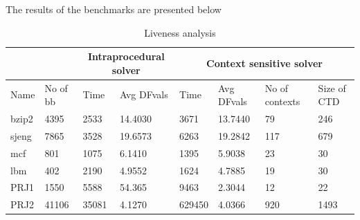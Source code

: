 \documentclass[12pt]{report}
\begin{document}
The results of the benchmarks are presented below

\begin {table}[H]
\label{tab:specliveness} 
\begin{flushleft}
\begin{tabular}{|l | l | l | p{2.3cm} | l | p{2.3cm} | p{1.4cm} | p{1.2cm} | }
  \hline                        
  \multicolumn{2}{|c|}{} &
  \multicolumn{2}{|c|}{Intraprocedural solver} &
  \multicolumn{4}{|c|}{Context sensitive solver} \\
  \hline
  Name & No of bb & Time & Avg DFvals &  Time  & Avg DFvals    & No of \newline contexts  & Size of \newline CTD \\  \hline  
  bzip2& 4395     & 2533 &  14.4030   & 3671   & 13.7440       & 79                       & 246                  \\ \hline  
  sjeng& 7865     & 3528 &  19.6573   & 6263   & 19.2842       & 117                      & 679                  \\  \hline  
  mcf  & 801      & 1075 &  6.1410    & 1395   & 5.9038        & 23                       & 30                   \\  \hline
  lbm  & 402      & 2190 &  4.9552    & 1624   & 4.7885        & 19                       & 30                   \\  \hline
  PRJ1 & 1550     & 5588 &  54.365    & 9463   & 2.3044        & 12                       & 22                   \\  \hline
  PRJ2 & 41106    & 35081&  4.1270    & 629450 & 4.0366        & 920                      & 1493                 \\  \hline  
\end{tabular}
\end{flushleft}
\caption {Liveness analysis}
\end {table}
\end{document}
